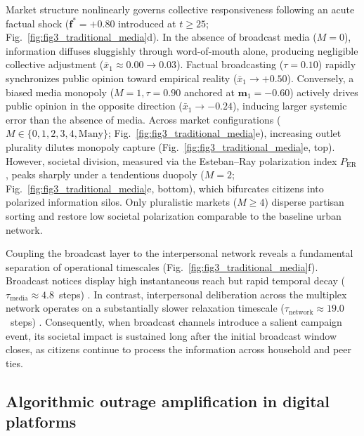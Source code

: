 \documentclass[11pt,a4paper]{article}
\begin{document}
Market structure nonlinearly governs collective responsiveness following an acute factual shock ($\mathbf{f}^* = +0.80$ introduced at $t \ge 25$; Fig.~\ref{fig:fig3_traditional_media}d). In the absence of broadcast media ($M=0$), information diffuses sluggishly through word-of-mouth alone, producing negligible collective adjustment ($\bar{x}_1 \approx 0.00 \to 0.03$). Factual broadcasting ($\tau = 0.10$) rapidly synchronizes public opinion toward empirical reality ($\bar{x}_1 \to +0.50$). Conversely, a biased media monopoly ($M=1, \tau = 0.90$ anchored at $\mathbf{m}_1 = -0.60$) actively drives public opinion in the opposite direction ($\bar{x}_1 \to -0.24$), inducing larger systemic error than the absence of media. Across market configurations ($M \in \{0, 1, 2, 3, 4, \text{Many}\}$; Fig.~\ref{fig:fig3_traditional_media}e), increasing outlet plurality dilutes monopoly capture (Fig.~\ref{fig:fig3_traditional_media}e, top). However, societal division, measured via the Esteban--Ray polarization index $P_{\mathrm{ER}}$ \citep{esteban1994measurement}, peaks sharply under a tendentious duopoly ($M=2$; Fig.~\ref{fig:fig3_traditional_media}e, bottom), which bifurcates citizens into polarized information silos. Only pluralistic markets ($M \ge 4$) disperse partisan sorting and restore low societal polarization comparable to the baseline urban network.

Coupling the broadcast layer to the interpersonal network reveals a fundamental separation of operational timescales (Fig.~\ref{fig:fig3_traditional_media}f). Broadcast notices display high instantaneous reach but rapid temporal decay ($\tau_{\mathrm{media}} \approx 4.8$~steps) \citep{downs1972up}. In contrast, interpersonal deliberation across the multiplex network operates on a substantially slower relaxation timescale ($\tau_{\mathrm{network}} \approx 19.0$~steps) \citep{friedkin1990social}. Consequently, when broadcast channels introduce a salient campaign event, its societal impact is sustained long after the initial broadcast window closes, as citizens continue to process the information across household and peer ties.

\subsection*{Algorithmic outrage amplification in digital platforms}
\end{document}

